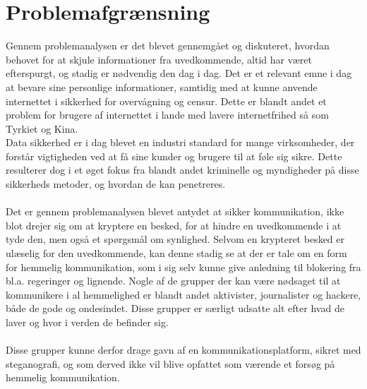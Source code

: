 \section{Problemafgrænsning}
Gennem problemanalysen er det blevet gennemgået og diskuteret, hvordan behovet for at skjule informationer fra uvedkommende, altid har været efterspurgt, og stadig er nødvendig den dag i dag. Det er et relevant emne i dag at bevare sine personlige informationer, samtidig med at kunne anvende internettet i sikkerhed for overvågning og censur. Dette er blandt andet et problem for brugere af internettet i lande med lavere internetfrihed så som Tyrkiet og Kina.\cite{FreedomHouseRapport2017}\\
\noindent
Data sikkerhed er i dag blevet en industri standard for mange virksomheder, der forstår vigtigheden ved at få sine kunder og brugere til at føle sig sikre. Dette resulterer dog i et øget fokus fra blandt andet kriminelle og myndigheder på disse sikkerheds metoder, og hvordan de kan penetreres.
\\\\
Det er gennem problemanalysen blevet antydet at sikker kommunikation, ikke blot drejer sig om at kryptere en besked, for at hindre en uvedkommende i at tyde den, men også et spørgsmål om synlighed. Selvom en krypteret besked er ulæselig for den uvedkommende, kan denne stadig se at der er tale om en form for hemmelig kommunikation, som i sig selv kunne give anledning til blokering fra bl.a. regeringer og lignende. Nogle af de grupper der kan være nødsaget til at kommunikere i al hemmelighed er blandt andet aktivister, journalister og hackere, både de gode og ondesindet. Disse grupper er særligt udsatte alt efter hvad de laver og hvor i verden de befinder sig.\cite{FreedomHouseRapport2017}
\\\\
Disse grupper kunne derfor drage gavn af en kommunikationsplatform, sikret med steganografi, og som derved ikke vil blive opfattet som værende et forsøg på hemmelig kommunikation. 





